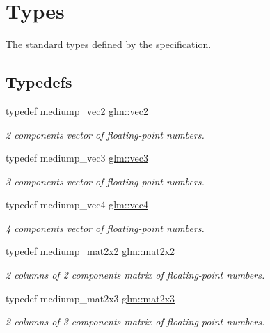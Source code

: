 \hypertarget{group__core__types}{\section{Types}
\label{group__core__types}
}


The standard types defined by the specification.  


\subsection*{Typedefs}
\begin{DoxyCompactItemize}
\item 
typedef mediump\-\_\-vec2 \hyperlink{group__core__types_ga66d091b759687504ab01365fbd33a1dd}{glm\-::vec2}
\begin{DoxyCompactList}\small\item\em 2 components vector of floating-\/point numbers. \end{DoxyCompactList}\item 
typedef mediump\-\_\-vec3 \hyperlink{group__core__types_gad45787527c6ff2bd6680867204eb0354}{glm\-::vec3}
\begin{DoxyCompactList}\small\item\em 3 components vector of floating-\/point numbers. \end{DoxyCompactList}\item 
typedef mediump\-\_\-vec4 \hyperlink{group__core__types_gae9c89157f980f7247cdee8bf55787035}{glm\-::vec4}
\begin{DoxyCompactList}\small\item\em 4 components vector of floating-\/point numbers. \end{DoxyCompactList}\item 
typedef mediump\-\_\-mat2x2 \hyperlink{group__core__types_gac35d9aae8d7beaceba6d18f6e26261a4}{glm\-::mat2x2}
\begin{DoxyCompactList}\small\item\em 2 columns of 2 components matrix of floating-\/point numbers. \end{DoxyCompactList}\item 
typedef mediump\-\_\-mat2x3 \hyperlink{group__core__types_gad23070b803932f5f3c9d9c2fd4d64895}{glm\-::mat2x3}
\begin{DoxyCompactList}\small\item\em 2 columns of 3 components matrix of floating-\/point numbers. \end{DoxyCompactList}\item 

\end{DoxyCompactItemize}
